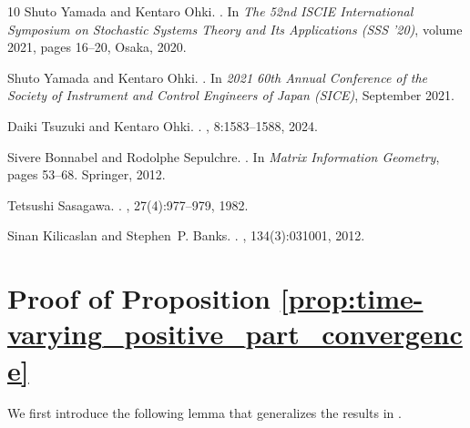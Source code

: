 \documentclass[fleqn,10pt]{SICE_FES26}
\begin{document}
\begin{thebibliography}{10}
Shuto Yamada and Kentaro Ohki.
.
\newblock In {\em The 52nd ISCIE International Symposium on Stochastic Systems
  Theory and Its Applications (SSS '20)}, volume 2021, pages 16--20, Osaka,
  2020.

Shuto Yamada and Kentaro Ohki.
.
\newblock In {\em 2021 60th Annual Conference of the Society of Instrument and
  Control Engineers of Japan (SICE)}, September 2021.

Daiki Tsuzuki and Kentaro Ohki.
.
, 8:1583--1588, 2024.

Sivere Bonnabel and Rodolphe Sepulchre.
.
\newblock In {\em {Matrix Information Geometry}}, pages 53--68. Springer, 2012.

Tetsushi Sasagawa.
.
, 27(4):977--979, 1982.

Sinan Kilicaslan and Stephen~P. Banks.
.
,
  134(3):031001, 2012.

\end{thebibliography}



\appendix
\section{Proof of Proposition \ref{prop:time-varying_positive_part_convergence}}
\label{proof:time-varying_positive_part_convergence}

We first introduce the following lemma that generalizes the results in \cite{sasagawa1982finite}. 
    
\end{document}
